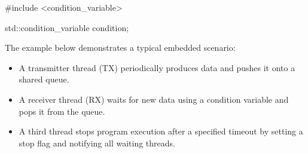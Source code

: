 \begin{cppcode}
#include <condition_variable>

std::condition_variable condition{};
\end{cppcode}

\noindent The example below demonstrates a typical embedded scenario:
\begin{itemize}
  \item A transmitter thread (TX) periodically produces data and pushes it onto a shared queue.
  \item A receiver thread (RX) waits for new data using a condition variable and pops it from the
    queue.
  \item A third thread stops program execution after a specified timeout by setting a stop flag
    and notifying all waiting threads.
\end{itemize}

